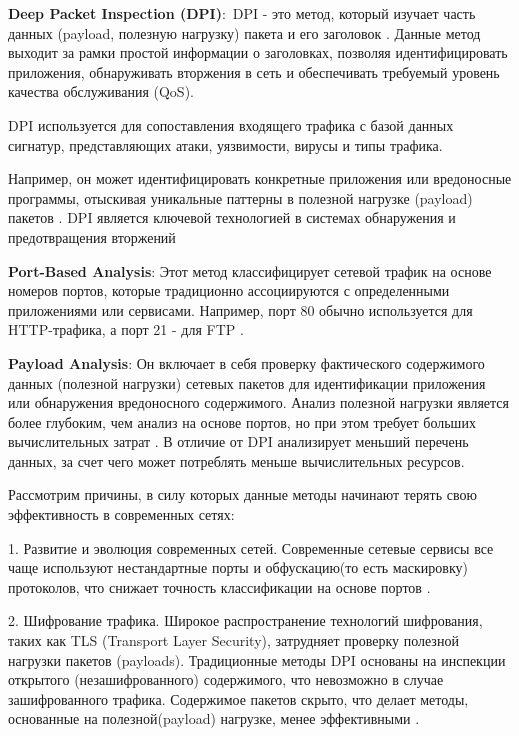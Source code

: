 \textbf{Deep Packet Inspection (DPI)}: DPI - это метод, который изучает часть данных (payload, полезную нагрузку) пакета и его заголовок \cite{Chaudhary2011, Oklilas2017}. Данные метод выходит за рамки простой информации о заголовках, позволяя идентифицировать приложения, обнаруживать вторжения в сеть и обеспечивать требуемый уровень качества обслуживания (QoS)\cite{Shubbar2017, Lin2014}.

DPI используется для сопоставления входящего трафика с базой данных сигнатур, представляющих атаки, уязвимости, вирусы и типы трафика.
\cite{Chaudhary2011}


Например, он может идентифицировать конкретные приложения или вредоносные программы, отыскивая уникальные паттерны в полезной нагрузке (payload) пакетов \cite{Lin2014}. DPI является ключевой технологией в системах обнаружения и предотвращения вторжений \cite{Shubbar2017, Parvat2015}


\textbf{Port-Based Analysis}: Этот метод классифицирует сетевой трафик на основе номеров портов, которые традиционно ассоциируются с определенными приложениями или сервисами. Например, порт 80 обычно используется для HTTP-трафика, а порт 21 - для FTP \cite{Hou2020}.

\textbf{Payload Analysis}: Он включает в себя проверку фактического содержимого данных (полезной нагрузки) сетевых пакетов для идентификации приложения или обнаружения вредоносного содержимого. Анализ полезной нагрузки является более глубоким, чем анализ на основе портов, но при этом требует больших вычислительных затрат \cite{Khandait2020}. В отличие от DPI анализирует меньший перечень данных, за счет чего может потреблять меньше вычислительных ресурсов.

Рассмотрим причины, в силу которых данные методы начинают терять свою эффективность в современных сетях:

1.	Развитие и эволюция современных сетей. Современные сетевые сервисы все чаще используют нестандартные порты и обфускацию(то есть маскировку) протоколов, что снижает точность классификации на основе портов \cite{Hou2020}.

2.	Шифрование трафика. Широкое распространение технологий шифрования, таких как TLS (Transport Layer Security), затрудняет проверку полезной нагрузки пакетов (payloads). Традиционные методы DPI основаны на инспекции открытого (незашифрованного) содержимого, что невозможно в случае зашифрованного трафика. Содержимое пакетов скрыто, что делает методы, основанные на полезной(payload) нагрузке, менее эффективными \cite{Ji2024, Shen2023}.


